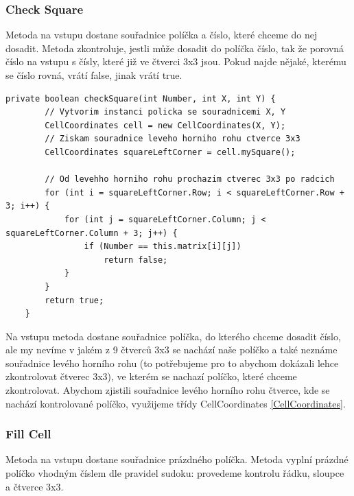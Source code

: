 \label{CheckSquare}\subsubsection{Check Square}
Metoda na vstupu dostane souřadnice políčka a číslo, které chceme do nej dosadit. Metoda zkontroluje, jestli může dosadit do políčka číslo, tak že porovná číslo na vstupu s čísly, které již ve čtverci 3x3 jsou. Pokud najde nějaké, kterému se číslo rovná, vrátí false, jinak vrátí true.

\begin{small}
\begin{lstlisting}
private boolean checkSquare(int Number, int X, int Y) {
        // Vytvorim instanci policka se souradnicemi X, Y
        CellCoordinates cell = new CellCoordinates(X, Y);
        // Ziskam souradnice leveho horniho rohu ctverce 3x3
        CellCoordinates squareLeftCorner = cell.mySquare();

        // Od levehho horniho rohu prochazim ctverec 3x3 po radcich
        for (int i = squareLeftCorner.Row; i < squareLeftCorner.Row + 3; i++) {
            for (int j = squareLeftCorner.Column; j < squareLeftCorner.Column + 3; j++) {
                if (Number == this.matrix[i][j])
                    return false;
            }
        }
        return true;
    }
\end{lstlisting}
\end{small}
Na vstupu metoda dostane souřadnice políčka, do kterého chceme dosadit číslo, ale my nevíme v jakém z 9 čtverců 3x3 se nachází naše políčko a také neznáme souřadnice levého horního rohu (to potřebujeme pro to abychom dokázali lehce zkontrolovat čtverec 3x3), ve kterém se nachazí políčko, které chceme zkontrolovat. Abychom zjistili souřadnice levého horního rohu čtverce, kde se nachází kontrolované políčko, využijeme třídy CellCoordinates \ref{CellCoordinates}.

\label{FillCell}\subsubsection{Fill Cell}
Metoda na vstupu dostane souřadnice prázdného políčka. Metoda vyplní prázdné políčko vhodným číslem dle pravidel sudoku: provedeme kontrolu řádku, sloupce a čtverce 3x3.

